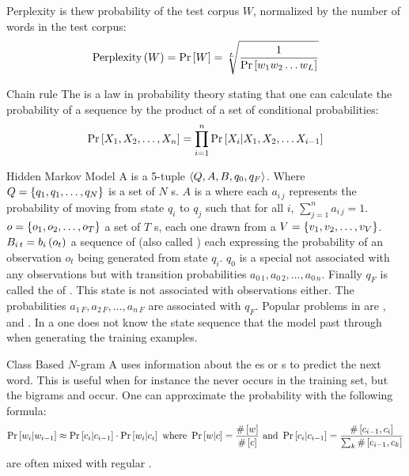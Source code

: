 \begin{df}{Perplexity}
\sb{} is thew probability of the test corpus $W$, normalized by the number of words in the test corpus:
\begin{equation}
\mbox{Perplexity}\left(W\right)=\Pr\left[W\right]=\sqrt[L]{\displaystyle\frac{1}{\Pr\left[w_1w_2\ldots w_L\right]}}
\end{equation}
\end{df}
\begin{df}{Chain rule}
The \sb{} is a law in probability theory stating that one can calculate the probability of a sequence by the product of a set of conditional probabilities:
\begin{equation}
\Pr\left[X_1,X_2,\ldots,X_n\right]=\displaystyle\prod_{i=1}^{n}\Pr\left[X_i|X_1,X_2,\ldots X_{i-1}\right]
\end{equation}
\end{df}
\begin{df}{Hidden Markov Model}
A \sb{} is a 5-tuple $\left\langle Q,A,B,q_0,q_F\right\rangle$. Where $Q=\left\{q_1,q_1,\ldots,q_N\right\}$ is a set of $N$ s. $A$ is a  where each $a_{i\,j}$ represents the probability of moving from state $q_i$ to $q_j$ such that for all $i$, $\sum_{j=1}^{n}{a_{i\,j}}=1$. $o=\left\{o_1,o_2,\ldots,o_T\right\}$ a set of $T$ s, each one drawn from a  $V=\left\{v_1,v_2,\ldots,v_V\right\}$. $B_{i\,t}=b_i\left(o_t\right)$ a sequence of  (also called ) each expressing the probability of an observation $o_t$ being generated from state $q_i$. $q_0$ is a special  not associated with any observations but with transition probabilities $a_{0\,1},a_{0\,2},\ldots,a_{0\,n}$. Finally $q_F$ is called the  of . This state is not associated with observations either. The probabilities $a_{1\,F},a_{2\,F},\ldots,a_{n\,F}$ are associated with $q_F$. Popular problems in \sb{} are ,  and . In a \sb{} one does not know the state sequence that the model past through when generating the training examples.
\end{df}
\begin{df}{Class Based $N$-gram}
A \sb{} uses information about the es or s to predict the next word. This is useful when for instance the  never occurs in the training set, but the bigrams  and  occur. One can approximate the probability with the following formula:
\begin{equation}
\Pr\left[w_i|w_{i-1}\right]\approx\Pr\left[c_i|c_{i-1}\right]\cdot\Pr\left[w_i|c_i\right]\mbox{ where }\Pr\left[w|c\right]=\displaystyle\frac{\#\left[w\right]}{\#\left[c\right]}\mbox{ and }\Pr\left[c_i|c_{i-1}\right]=\displaystyle\frac{\#\left[c_{i-1},c_i\right]}{\sum_k\#\left[c_{i-1},c_k\right]}
\end{equation}
\sb{} are often mixed with regular .
\end{df}
